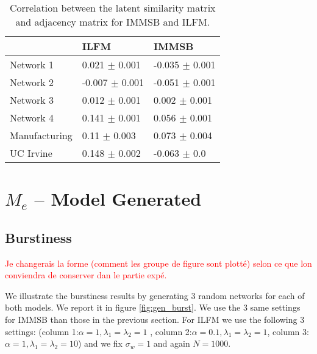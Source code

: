 \documentclass[a4paper, 12pt]{article}
\begin{document}
\begin{table}
    \caption{Correlation between the latent similarity matrix and adjacency matrix for IMMSB and ILFM.}
    \begin{tabular}{lll}
    \hline
    & ILFM  & IMMSB \\
    \hline
    Network 1     & 0.021 $\pm$ 0.001  & -0.035 $\pm$ 0.001      \\
    Network 2     & -0.007 $\pm$ 0.001 & -0.051 $\pm$ 0.001      \\
    Network 3     & 0.012 $\pm$ 0.001  & 0.002 $\pm$ 0.001       \\
    Network 4     & 0.141 $\pm$ 0.001  & 0.056 $\pm$ 0.001       \\
    Manufacturing & 0.11 $\pm$ 0.003   & 0.073 $\pm$ 0.004       \\
    UC Irvine     & 0.148 $\pm$ 0.002  & -0.063 $\pm$ 0.0        \\
    \hline
    \end{tabular}
\end{table}




\section{$M_e$ -- Model Generated}
\label{sec:mgmg}

\subsection{Burstiness}

\textcolor{red}{Je changerais la forme (comment les groupe de figure sont plotté) selon ce que lon conviendra de conserver dan le partie expé.}

We illustrate the burstiness results by generating 3 random networks for each of both models. We report it in figure \ref{fig:gen_burst}. We use the 3 same settings for IMMSB  than those in the previous section. For ILFM  we use the following 3 settings: (column 1:$\alpha=1,  \lambda_1=\lambda_2=1$ , column 2:$\alpha=0.1, \lambda_1=\lambda_2=1$, column 3: $\alpha=1, \lambda_1=\lambda_2=10$) and we fix $\sigma_w=1$ and again $N=1000$.
\end{document}
